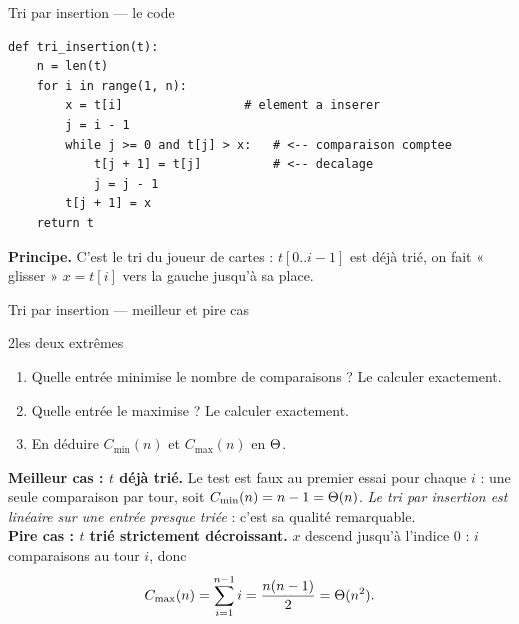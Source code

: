 \documentclass[11pt,aspectratio=169]{beamer}
\begin{document}
\begin{frame}[fragile]{Tri par insertion --- le code}
\begin{lstlisting}
def tri_insertion(t):
    n = len(t)
    for i in range(1, n):
        x = t[i]                 # element a inserer
        j = i - 1
        while j >= 0 and t[j] > x:   # <-- comparaison comptee
            t[j + 1] = t[j]          # <-- decalage
            j = j - 1
        t[j + 1] = x
    return t
\end{lstlisting}
\begin{encadre}\small
\textbf{Principe.} C'est le tri du joueur de cartes : $t[0..i-1]$ est déjà trié, on fait
« glisser » $x=t[i]$ vers la gauche jusqu'à sa place.
\end{encadre}
\end{frame}

\begin{frame}[fragile]{Tri par insertion --- meilleur et pire cas}
\begin{exercice}{2}{les deux extrêmes}
\begin{enumerate}\setlength\itemsep{1pt}
  \item Quelle entrée minimise le nombre de comparaisons ? Le calculer exactement.
  \item Quelle entrée le maximise ? Le calculer exactement.
  \item En déduire $C_{\min}(n)$ et $C_{\max}(n)$ en $\Theta$.
\end{enumerate}
\end{exercice}
\pause
\begin{soluce}
\small
\textbf{Meilleur cas : $t$ déjà trié.} Le test  est faux au premier essai
pour chaque $i$ : une seule comparaison par tour, soit
$C_{\min}(n)=n-1=\Theta(n)$. \emph{Le tri par insertion est linéaire sur une entrée presque
triée} : c'est sa qualité remarquable.\\[3pt]
\textbf{Pire cas : $t$ trié strictement décroissant.} $x$ descend jusqu'à l'indice $0$ :
$i$ comparaisons au tour $i$, donc
\[
C_{\max}(n)=\sum_{i=1}^{n-1} i=\frac{n(n-1)}2=\Theta(n^2).
\]
\end{soluce}
\end{frame}
\end{document}
